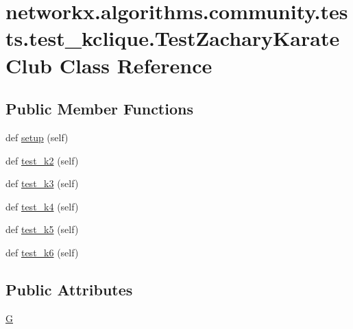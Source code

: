 \hypertarget{classnetworkx_1_1algorithms_1_1community_1_1tests_1_1test__kclique_1_1TestZacharyKarateClub}{}\section{networkx.\+algorithms.\+community.\+tests.\+test\+\_\+kclique.\+Test\+Zachary\+Karate\+Club Class Reference}
\label{classnetworkx_1_1algorithms_1_1community_1_1tests_1_1test__kclique_1_1TestZacharyKarateClub}
\subsection*{Public Member Functions}
\begin{DoxyCompactItemize}
\item 
def \hyperlink{classnetworkx_1_1algorithms_1_1community_1_1tests_1_1test__kclique_1_1TestZacharyKarateClub_a1eff0f7e6ff5c107533ae4900747786e}{setup} (self)
\item 
def \hyperlink{classnetworkx_1_1algorithms_1_1community_1_1tests_1_1test__kclique_1_1TestZacharyKarateClub_ae37b935f428f269301026f04ff700b47}{test\+\_\+k2} (self)
\item 
def \hyperlink{classnetworkx_1_1algorithms_1_1community_1_1tests_1_1test__kclique_1_1TestZacharyKarateClub_ae8b7ab6b0577c785affdeb0b2f38a93f}{test\+\_\+k3} (self)
\item 
def \hyperlink{classnetworkx_1_1algorithms_1_1community_1_1tests_1_1test__kclique_1_1TestZacharyKarateClub_a595522d608d085368f15132e634db479}{test\+\_\+k4} (self)
\item 
def \hyperlink{classnetworkx_1_1algorithms_1_1community_1_1tests_1_1test__kclique_1_1TestZacharyKarateClub_a55a97490e8de5ce0156b5756dee2838e}{test\+\_\+k5} (self)
\item 
def \hyperlink{classnetworkx_1_1algorithms_1_1community_1_1tests_1_1test__kclique_1_1TestZacharyKarateClub_ab08e0b6179b7509a5cb873c0dcab2d22}{test\+\_\+k6} (self)
\end{DoxyCompactItemize}
\subsection*{Public Attributes}
\begin{DoxyCompactItemize}
\item 
\hyperlink{classnetworkx_1_1algorithms_1_1community_1_1tests_1_1test__kclique_1_1TestZacharyKarateClub_ab6a02b300d80398cca01065ef7fb0562}{G}
\end{DoxyCompactItemize}


